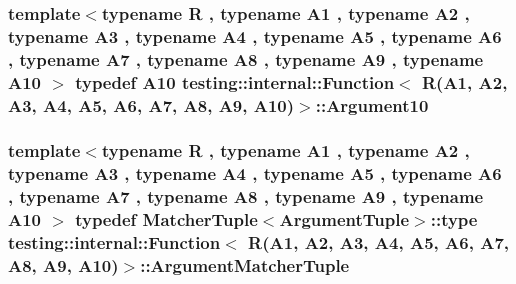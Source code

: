 \subsubsection[{\texorpdfstring{Argument10}{Argument10}}]{\setlength{\rightskip}{0pt plus 5cm}template$<$typename R , typename A1 , typename A2 , typename A3 , typename A4 , typename A5 , typename A6 , typename A7 , typename A8 , typename A9 , typename A10 $>$ typedef A10 {\bf testing\+::internal\+::\+Function}$<$ R(A1, A2, A3, A4, A5, A6, A7, A8, A9, A10)$>$\+::{\bf Argument10}}\hypertarget{structtesting_1_1internal_1_1_function_3_01_r_07_a1_00_01_a2_00_01_a3_00_01_a4_00_01_a5_00_01_a6f6ff91550f0557b7708e490e5002cd35_a74022db8f1642276a1a9033da16cc2f5}{}\label{structtesting_1_1internal_1_1_function_3_01_r_07_a1_00_01_a2_00_01_a3_00_01_a4_00_01_a5_00_01_a6f6ff91550f0557b7708e490e5002cd35_a74022db8f1642276a1a9033da16cc2f5}
\subsubsection[{\texorpdfstring{Argument\+Matcher\+Tuple}{ArgumentMatcherTuple}}]{\setlength{\rightskip}{0pt plus 5cm}template$<$typename R , typename A1 , typename A2 , typename A3 , typename A4 , typename A5 , typename A6 , typename A7 , typename A8 , typename A9 , typename A10 $>$ typedef {\bf Matcher\+Tuple}$<${\bf Argument\+Tuple}$>$\+::type {\bf testing\+::internal\+::\+Function}$<$ R(A1, A2, A3, A4, A5, A6, A7, A8, A9, A10)$>$\+::{\bf Argument\+Matcher\+Tuple}}\hypertarget{structtesting_1_1internal_1_1_function_3_01_r_07_a1_00_01_a2_00_01_a3_00_01_a4_00_01_a5_00_01_a6f6ff91550f0557b7708e490e5002cd35_ad2418eacffea2e3cc5466c93b1fd7002}{}\label{structtesting_1_1internal_1_1_function_3_01_r_07_a1_00_01_a2_00_01_a3_00_01_a4_00_01_a5_00_01_a6f6ff91550f0557b7708e490e5002cd35_ad2418eacffea2e3cc5466c93b1fd7002}
